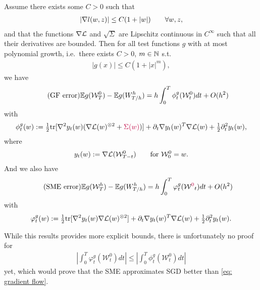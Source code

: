 \begin{theorem}
	Assume there exists some \(C>0\) such that
	\begin{align*}
		|\nabla l(w, z)| \le C(1+|w|)
		\qquad \forall w, z,
	\end{align*}
	and that the functions \(\nabla\mathcal{L}\) and \(\sqrt{\Sigma}\) are Lipschitz
	continuous in \(C^{\infty}\) such that all their derivatives are bounded.
	Then for all test functions \(g\) with at most polynomial growth, i.e.\ there
	exists \(C>0\), \(m\in\mathbb{N}\) s.t. 
	\begin{align*}
		|g(x)| \le C(1+|x|^m),
	\end{align*}
	we have
	\begin{align}
		\tag{GF error}
		\mathbb{E} g(\mathcal{W}^0_T) - \mathbb{E} g(W_{T/h}^h)
		= h \int_0^T \phi_t^g(\mathcal{W}^0_t)dt + O(h^2)
	\end{align}
	with
	\begin{align*}
		\phi_t^g(w)
		:= \tfrac12 \text{tr}[
			\nabla^2 y_t(w)
			(\nabla\mathcal{L}(w)^{\otimes 2} + { \color{purple} \Sigma(w)})
		]
		+ \partial_t\nabla y_t(w)^T \nabla\mathcal{L}(w)
		+ \tfrac12 \partial_t^2 y_t(w),
	\end{align*}
	where
	\begin{align*}
		y_t(w) := \nabla\mathcal{L}(\mathcal{W}_{T-t}^0)
		\qquad \text{for } \mathcal{W}^0_0 = w.
	\end{align*}
	And we also have
	\begin{align}
		\tag{SME error}
		\mathbb{E} g(\mathcal{W}^h_T) - \mathbb{E} g(W_{T/h}^h)
		= h \int_0^T \varphi_t^g(\mathcal{W}^{\color{purple}0}_t)dt + O(h^2)
	\end{align}
	with
	\begin{align*}
		\varphi_t^g(w)
		:= \tfrac12 \text{tr}[
			\nabla^2 y_t(w)\nabla\mathcal{L}(w)^{\otimes 2}
		]
		+ \partial_t\nabla y_t(w)^T \nabla\mathcal{L}(w)
		+ \tfrac12 \partial_t^2 y_t(w).
	\end{align*}
\end{theorem}

While this results provides more explicit bounds, there is unfortunately no
proof for
\begin{align*}
	\left| \int_0^T \varphi_t^g(\mathcal{W}^0_t)dt \right|
	\le \left| \int_0^T \phi_t^g(\mathcal{W}^0_t)dt \right|
\end{align*}
yet, which would prove that the SME approximates SGD better than \ref{eq:
gradient flow}.


